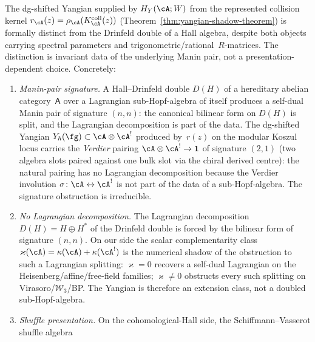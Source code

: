 \begin{remark}
\label{rem:frontier-hall-drinfeld-vs-yangian}
\ClaimStatusConditional
{}
The dg-shifted Yangian supplied by $H_Y(\cA;W)$ from the represented
collision kernel
$r_\cA(z)=\rho_\cA(K_\cA^{\mathrm{coll}}(z))$
\textup{(}Theorem~\ref{thm:yangian-shadow-theorem}\textup{)} is
formally distinct from the Drinfeld double of a Hall
algebra, despite both objects carrying spectral parameters and
trigonometric/rational~$R$-matrices. The distinction is invariant
data of the underlying Manin pair, not a presentation-dependent
choice. Concretely:
\begin{enumerate}[label=\textup{(\roman*)}]
\item \emph{Manin-pair signature.}
 A Hall--Drinfeld double $D(H)$ of a hereditary abelian
 category~$\mathsf A$ over a Lagrangian sub-Hopf-algebra of itself
 produces a self-dual Manin pair of signature $(n,n)$:
 the canonical bilinear form on $D(H)$ is split, and the
 Lagrangian decomposition is part of the data. The dg-shifted
 Yangian
 $Y_\hbar(\fg) \subset \cA \otimes \cA^!$
 produced by~$r(z)$ on the modular Koszul locus carries the
 \emph{Verdier} pairing
 $\cA \otimes \cA^! \to \mathbf 1$
 of signature $(2,1)$ (two algebra slots paired against one bulk
 slot via the chiral derived centre): the natural pairing has no
 Lagrangian decomposition because the Verdier involution
 $\sigma\colon \cA \leftrightarrow \cA^!$ is not part of the data
 of a sub-Hopf-algebra. The signature obstruction is irreducible.
\item \emph{No Lagrangian decomposition.}
 The Lagrangian decomposition
 $D(H) = H \oplus H^*$
 of the Drinfeld double is forced by the bilinear form of
 signature $(n,n)$. On our side the scalar complementarity class
 $\varkappa(\cA) = \kappa(\cA) + \kappa(\cA^!)$
 is the numerical shadow of the obstruction to such a Lagrangian
 splitting:
 $\varkappa = 0$ recovers a self-dual Lagrangian on the
 Heisenberg/affine/free-field families; $\varkappa \neq 0$
 obstructs every such splitting on Virasoro/$\mathcal{W}_3$/BP.
 The Yangian is therefore an extension class, not a doubled
 sub-Hopf-algebra.
\item \emph{Shuffle presentation.}
 On the cohomological-Hall side, the
 Schiffmann--Vasserot shuffle algebra

\end{enumerate}
\end{remark}
